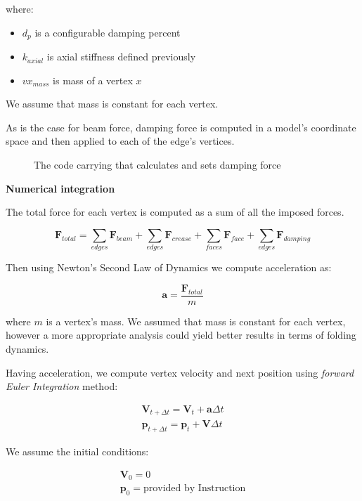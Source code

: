 where:

\begin{itemize}
	\item $d_p$ is a configurable damping percent
	\item $k_{axial}$ is axial stiffness defined previously
	\item $vx_{mass}$ is mass of a vertex $x$
\end{itemize}

We assume that mass is constant for each vertex.

As is the case for beam force, damping force is computed in a model's coordinate space
and then applied to each of the edge's vertices.
\smallskip

\begin{figure}[H]
	\centering
	\caption{The code carrying that calculates and sets damping force}
	
\end{figure}

\clearpage
\textbf{Numerical integration}
\smallskip

The total force for each vertex is computed as a sum of all the imposed forces.

\begin{equation} \label{Solver:total_force}
	\pmb{F}_{total} = \sum_{edges} \pmb{F}_{beam} + \sum_{edges} \pmb{F}_{crease} + \sum_{faces}\pmb{F}_{face} + \sum_{edges}\pmb{F}_{damping}
\end{equation}

Then using Newton's Second Law of Dynamics we compute acceleration as:

$$
\pmb{a} = \frac{\pmb{F}_{total}}{m}
$$

where $m$ is a vertex's mass. We assumed that mass is constant for each vertex, however a more appropriate analysis could yield
better results in terms of folding dynamics.

Having acceleration, we compute vertex velocity and next position using \textit{forward Euler Integration} method:

$$
\begin{aligned}
\pmb{V}_{t+\Delta t} = \pmb{V}_t + \pmb{a}\Delta t \\
\pmb{p}_{t+\Delta t} = \pmb{p}_t + \pmb{V}\Delta t
\end{aligned}
$$

We assume the initial conditions:

\begin{equation}
	\begin{aligned}
		\pmb{V}_0 = 0\\
		\pmb{p}_0 = \text{provided by Instruction}
	\end{aligned}
\end{equation}


